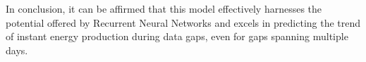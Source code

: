 In conclusion, it can be affirmed that this model effectively
harnesses the potential offered by Recurrent Neural Networks and
excels in predicting the trend of instant energy production
during data gaps, even for gaps spanning multiple days.


